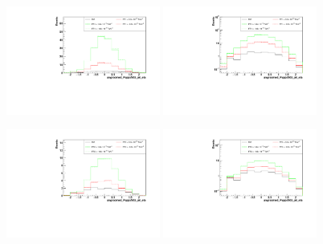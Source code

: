 \begin{figure}[h]
  \begin{center}
	\includegraphics[width=0.45\textwidth]{Plots/aQGC_kinematics/ungroomed_PuppiAK8_jet_eta_FT1.pdf}%
	\includegraphics[width=0.45\textwidth]{Plots/aQGC_kinematics/ungroomed_PuppiAK8_jet_eta_FT1_log.pdf}\\		
    \caption{}
  \end{center}
\end{figure}
\begin{figure}[h]
  \begin{center}
	\includegraphics[width=0.45\textwidth]{Plots/aQGC_kinematics/ungroomed_PuppiAK8_jet_eta_FT2.pdf}%
	\includegraphics[width=0.45\textwidth]{Plots/aQGC_kinematics/ungroomed_PuppiAK8_jet_eta_FT2_log.pdf}\\		
    \caption{}
  \end{center}
\end{figure}
